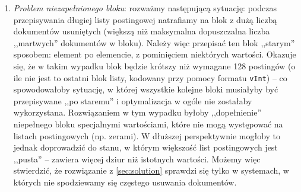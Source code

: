 \begin{enumerate}
 \item \emph{Problem niezapełnionego bloku}: rozważmy następującą sytuację: podczas przepisywania długiej listy postingowej natrafiamy na blok z dużą liczbą dokumentów usuniętych (większą niż maksymalna dopuszczalna liczba ,,martwych'' dokumentów w bloku). Należy więc przepisać ten blok ,,starym'' sposobem: element po elemencie, z pominięciem niektórych wartości. Okazuje się, że w takim wypadku blok będzie krótszy niż wymagane 128 postingów (o ile nie jest to ostatni blok listy, kodowany przy pomocy formatu \texttt{vInt}) -- co spowodowałoby sytuację, w której wszystkie kolejne bloki musiałyby być przepisywane ,,po staremu'' i optymalizacja w ogóle nie zostałaby wykorzystana. Rozwiązaniem w tym wypadku byłoby ,,dopełnienie'' niepełnego bloku specjalnymi wartościami, które nie mogą występować na listach postingowych (np. zerami). W dłuższej perspektywnie mogłoby to jednak doprowadzić do stanu, w którym większość list postingowych jest ,,pusta'' -- zawiera więcej dziur niż istotnych wartości. Możemy więc stwierdzić, że rozwiązanie z \ref{sec:solution} sprawdzi się tylko w systemach, w których nie spodziewamy się częstego usuwania dokumentów.
\end{enumerate}